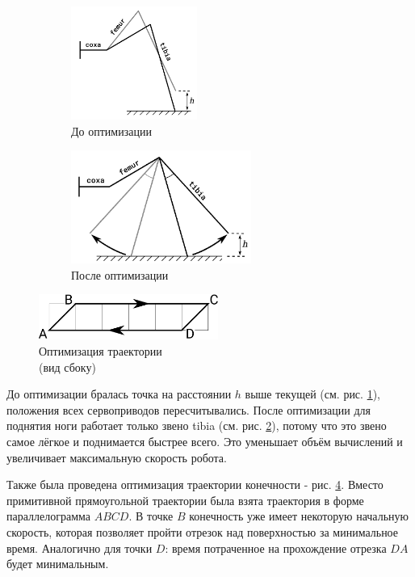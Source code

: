 \documentclass{article}
\begin{document}
\begin{figure}[h]
	\begin{subfigure}[b]{0.48\linewidth}
		\centering
		\includegraphics[height=10em]{optimize_1}
		\caption{До оптимизации}
		\label{fig:optimize_1}
	\end{subfigure}
	\hfill
	\begin{subfigure}[b]{0.52\linewidth}
		\centering
		\includegraphics[height=10em]{optimize_2}
		\caption{После оптимизации}
		\label{fig:optimize_2}
	\end{subfigure}
	\label{fig:optimize}
	\caption{}
\end{figure}

\begin{figure}
	\centering
	\includegraphics[height=4em]{trajectory}
	\caption{Оптимизация траектории\\(вид сбоку)}
	\label{fig:optimize_3}
\end{figure}

До оптимизации бралась точка на расстоянии $h$ выше текущей (см. рис. \ref{fig:optimize_1}), положения всех сервоприводов пересчитывались. После оптимизации для поднятия ноги работает только звено tibia (см. рис. \ref{fig:optimize_2}), потому что это звено самое лёгкое и поднимается быстрее всего. Это уменьшает объём вычислений и увеличивает максимальную скорость робота.

Также была проведена оптимизация траектории конечности - рис. \ref{fig:optimize_3}. Вместо примитивной прямоугольной траектории была взята траектория в форме параллелограмма $ABCD$. В точке $B$ конечность уже имеет некоторую начальную скорость, которая позволяет пройти отрезок над поверхностью за минимальное время. Аналогично для точки $D$: время потраченное на прохождение отрезка $DA$ будет минимальным.
\end{document}
